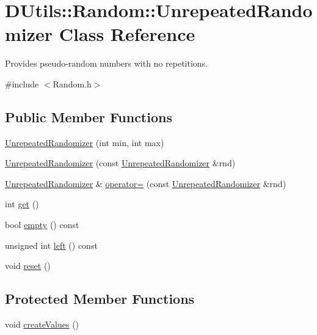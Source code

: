 \hypertarget{classDUtils_1_1Random_1_1UnrepeatedRandomizer}{}\section{D\+Utils\+:\+:Random\+:\+:Unrepeated\+Randomizer Class Reference}
\label{classDUtils_1_1Random_1_1UnrepeatedRandomizer}


Provides pseudo-\/random numbers with no repetitions.  




{\ttfamily \#include $<$Random.\+h$>$}

\subsection*{Public Member Functions}
\begin{DoxyCompactItemize}
\item 
\hyperlink{classDUtils_1_1Random_1_1UnrepeatedRandomizer_ae073cba77da776dae607f22fd289b220}{Unrepeated\+Randomizer} (int min, int max)
\item 
\hyperlink{classDUtils_1_1Random_1_1UnrepeatedRandomizer_af4d4b9621cb9a55ec59fb311798a3a5b}{Unrepeated\+Randomizer} (const \hyperlink{classDUtils_1_1Random_1_1UnrepeatedRandomizer}{Unrepeated\+Randomizer} \&rnd)
\item 
\hyperlink{classDUtils_1_1Random_1_1UnrepeatedRandomizer}{Unrepeated\+Randomizer} \& \hyperlink{classDUtils_1_1Random_1_1UnrepeatedRandomizer_a18f74b44fe6747fa3498bdbe6422648e}{operator=} (const \hyperlink{classDUtils_1_1Random_1_1UnrepeatedRandomizer}{Unrepeated\+Randomizer} \&rnd)
\item 
int \hyperlink{classDUtils_1_1Random_1_1UnrepeatedRandomizer_ae1bf6a140e322962f65b2c98dc07a3ac}{get} ()
\item 
bool \hyperlink{classDUtils_1_1Random_1_1UnrepeatedRandomizer_a4f93a3ab99e3e801d0c1d2599917a37a}{empty} () const
\item 
unsigned int \hyperlink{classDUtils_1_1Random_1_1UnrepeatedRandomizer_a8ba0925ac2e14881505a9575466ddc4f}{left} () const
\item 
void \hyperlink{classDUtils_1_1Random_1_1UnrepeatedRandomizer_a315e00744de8bb3794d154797d02ec1f}{reset} ()
\end{DoxyCompactItemize}
\subsection*{Protected Member Functions}
\begin{DoxyCompactItemize}
\item 
void \hyperlink{classDUtils_1_1Random_1_1UnrepeatedRandomizer_a583497053acec6991b9a872f924e8ccb}{create\+Values} ()
\end{DoxyCompactItemize}
